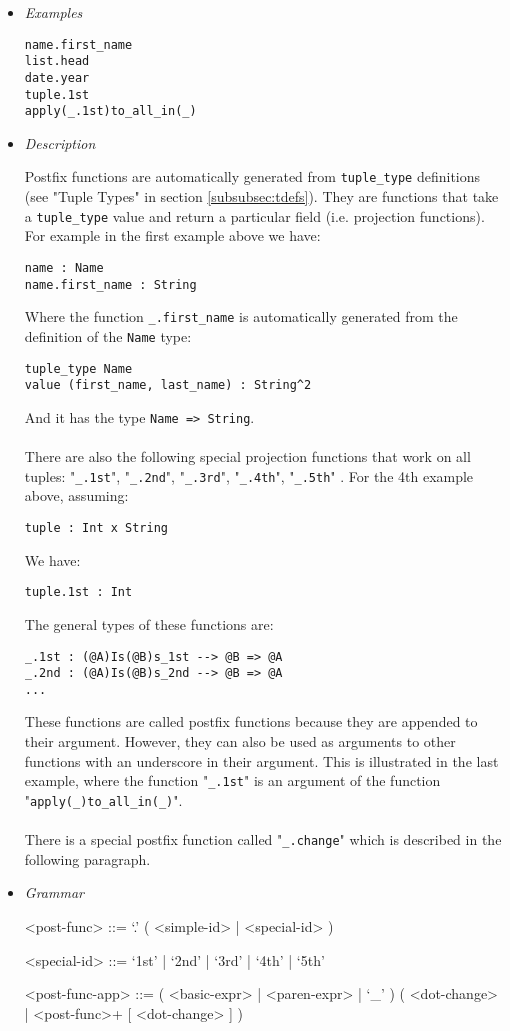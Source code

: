 \documentclass{article}
\begin{document}
\begin{itemize}

\item \textit{Examples}
\begin{verbatim}
name.first_name
list.head
date.year
tuple.1st
apply(_.1st)to_all_in(_)
\end{verbatim}

\item \textit{Description}

Postfix functions are automatically generated from \verb|tuple_type|
definitions (see "Tuple Types" in section \ref{subsubsec:tdefs}). They are
functions that take a \verb|tuple_type| value and return a particular field
(i.e. projection functions). For example in the first example above we have:
\begin{verbatim}
name : Name
name.first_name : String
\end{verbatim}
Where the function \verb|_.first_name| is automatically generated from the
definition of the \verb|Name| type:
\begin{verbatim}
tuple_type Name
value (first_name, last_name) : String^2
\end{verbatim}
And it has the type \verb|Name => String|.
\\\\
There are also the following special projection functions that work on all
tuples:
"\verb|_.1st|", "\verb|_.2nd|", "\verb|_.3rd|", "\verb|_.4th|", "\verb|_.5th|"
.
For the 4th example above, assuming:
\begin{verbatim}
tuple : Int x String
\end{verbatim}
We have:
\begin{verbatim}
tuple.1st : Int
\end{verbatim}
The general types of these functions are:
\begin{verbatim}
_.1st : (@A)Is(@B)s_1st --> @B => @A
_.2nd : (@A)Is(@B)s_2nd --> @B => @A
...
\end{verbatim}
These functions are called postfix functions because they are appended to their
argument. However, they can also be used as arguments to other functions with
an underscore in their argument. This is illustrated in the last example, where
the function "\verb|_.1st|" is an argument of the function
"\verb|apply(_)to_all_in(_)|".
\\\\
There is a special postfix function called "\verb|_.change|" which is described
in the following paragraph.

\item \textit{Grammar}
\begin{grammar}
<post-func> ::= `.' ( <simple-id> | <special-id> )

<special-id> ::= `1st' | `2nd' | `3rd' | `4th' | `5th'

<post-func-app> ::=
( <basic-expr> | <paren-expr> | `_' )
( <dot-change> | <post-func>+ [ <dot-change> ] )
\end{grammar}

\end{itemize}
\end{document}

